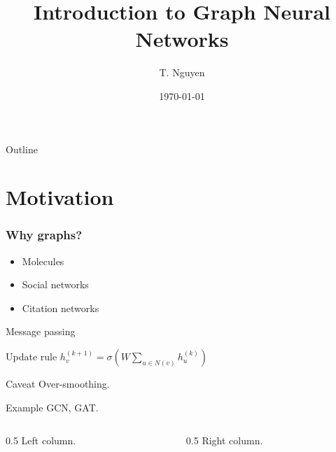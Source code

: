 \documentclass{beamer}
\title{Introduction to Graph Neural Networks}
\author{T. Nguyen}
\institute{Example University}
\date{\today}
\begin{document}
\frame{\titlepage}

\begin{frame}{Outline}
\tableofcontents
\end{frame}

\section{Motivation}
\begin{frame}
\frametitle{Why graphs?}
\begin{itemize}
\item<1-> Molecules
\item<2-> Social networks
\pause
\item Citation networks
\end{itemize}
\end{frame}

\begin{frame}[fragile]{Message passing}
\begin{block}{Update rule}
$h_v^{(k+1)} = \sigma\left(W \sum_{u \in N(v)} h_u^{(k)}\right)$
\end{block}
\begin{alertblock}{Caveat}
Over-smoothing.
\end{alertblock}
\begin{exampleblock}{Example}
GCN, GAT.
\end{exampleblock}
\begin{columns}
\begin{column}{0.5\textwidth}
Left column.
\end{column}
\begin{column}{0.5\textwidth}
Right column.
\end{column}
\end{columns}
\end{frame}
\end{document}
